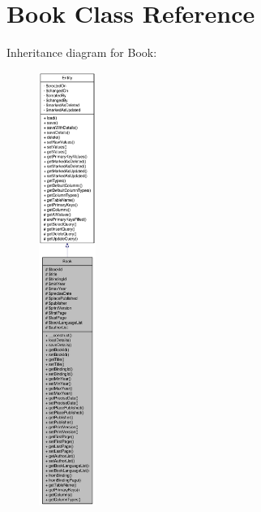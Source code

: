 \hypertarget{classBook}{
\section{Book Class Reference}
\label{classBook}
}


Inheritance diagram for Book:\nopagebreak
\begin{figure}[H]
\begin{center}
\leavevmode
\includegraphics[height=400pt]{classBook__inherit__graph}
\end{center}
\end{figure}


